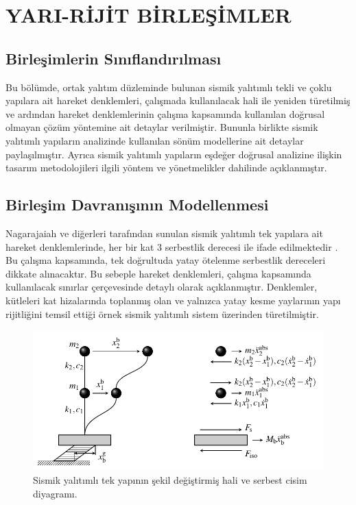 
\chapter{YARI-RİJİT BİRLEŞİMLER}

\label{CH2} 

\section{Birleşimlerin Sınıflandırılması}

Bu bölümde, ortak yalıtım düzleminde bulunan sismik yalıtımlı tekli
ve çoklu yapılara ait hareket denklemleri, çalışmada kullanılacak
hali ile yeniden türetilmiş ve ardından hareket denklemlerinin çalışma
kapsamında kullanılan doğrusal olmayan çözüm yöntemine ait detaylar
verilmiştir. Bununla birlikte sismik yalıtımlı yapıların analizinde
kullanılan sönüm modellerine ait detaylar paylaşılmıştır. Ayrıca sismik
yalıtımlı yapıların eşdeğer doğrusal analizine ilişkin tasarım metodolojileri
ilgili yöntem ve yönetmelikler dahilinde açıklanmıştır.

\section{Birleşim Davranışının Modellenmesi}

\label{eom-singlestructure} Nagarajaiah ve diğerleri tarafından sunulan
sismik yalıtımlı tek yapılara ait hareket denklemlerinde, her bir
kat 3 serbestlik derecesi ile ifade edilmektedir \cite{doi:10.1061/(ASCE)0733-9445(1991)117:7(2035)}.
Bu çalışma kapsamında, tek doğrultuda yatay ötelenme serbestlik dereceleri
dikkate alınacaktır. Bu sebeple hareket denklemleri, çalışma kapsamında
kullanılacak sınırlar çerçevesinde detaylı olarak açıklanmıştır. Denklemler,
kütleleri kat hizalarında toplanmış olan ve yalnızca yatay kesme yaylarının
yapı rijitliğini temsil ettiği örnek sismik yalıtımlı sistem üzerinden
türetilmiştir. 
\begin{figure}[h!]
\centering{}\includegraphics{TikZ/SingleStructureAndFBD} \caption{\label{fig:singlestructurefbd}Sismik yalıtımlı tek yapının şekil
değiştirmiş hali ve serbest cisim diyagramı.}
\end{figure}


